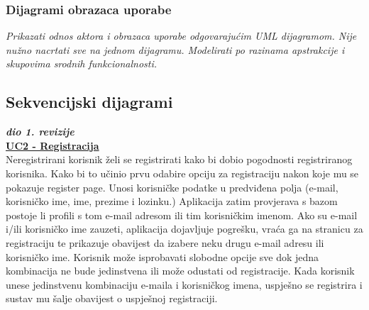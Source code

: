                     

                        


     
					
				\subsubsection{Dijagrami obrazaca uporabe}
					
					\textit{Prikazati odnos aktora i obrazaca uporabe odgovarajućim UML dijagramom. Nije nužno nacrtati sve na jednom dijagramu. Modelirati po razinama apstrakcije i skupovima srodnih funkcionalnosti.}
				\eject		
				
			\subsection{Sekvencijski dijagrami}
				
				\textbf{\textit{dio 1. revizije}}\\
				
				\underline{\textbf{UC2 - Registracija}}\\
				
				Neregistrirani korisnik želi se registrirati kako bi dobio pogodnosti registriranog korisnika. Kako bi to učinio prvu odabire opciju za registraciju nakon koje mu se pokazuje register page. Unosi korisničke podatke u predviđena polja (e-mail, korisničko ime, ime, prezime i lozinku.) Aplikacija zatim provjerava s bazom postoje li profili s tom e-mail adresom ili tim korisničkim imenom. Ako su e-mail i/ili korisničko ime zauzeti, aplikacija dojavljuje pogrešku, vraća ga na stranicu za registraciju te prikazuje obavijest da izabere neku drugu e-mail adresu ili korisničko ime. Korisnik može isprobavati slobodne opcije sve dok jedna kombinacija ne bude jedinstvena ili može odustati od registracije. Kada korisnik unese jedinstvenu kombinaciju e-maila i korisničkog imena, uspješno se registrira i sustav mu šalje obavijest o uspješnoj registraciji.
				
